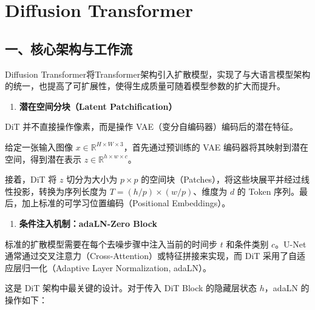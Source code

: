 \setcounter{section}{3}

\hypertarget{diffusion-transformer}{%
\section{Diffusion Transformer}\label{diffusion-transformer}}

\hypertarget{ux4e00ux6838ux5fc3ux67b6ux6784ux4e0eux5de5ux4f5cux6d41}{%
\subsection{一、核心架构与工作流}\label{ux4e00ux6838ux5fc3ux67b6ux6784ux4e0eux5de5ux4f5cux6d41}}

Diffusion Transformer将Transformer架构引入扩散模型，实现了与大语言模型架构的统一，也提高了可扩展性，使得生成质量可随着模型参数的扩大而提升。

\begin{enumerate}
\def\labelenumi{\arabic{enumi}.}
\tightlist
\item
  \textbf{潜在空间分块（Latent Patchification）}
\end{enumerate}

DiT 并不直接操作像素，而是操作 VAE（变分自编码器）编码后的潜在特征。

给定一张输入图像 \(x\in\mathbb{R}^{H\times W\times 3}\)，首先通过预训练的 VAE 编码器将其映射到潜在空间，得到潜在表示 \(z\in\mathbb{R}^{h\times w\times c}\)。

接着，DiT 将 \(z\) 切分为大小为 \(p\times p\) 的空间块（Patches），将这些块展平并经过线性投影，转换为序列长度为 \(T=(h/p)\times(w/p)\)、维度为 \(d\) 的 Token 序列。最后，加上标准的可学习位置编码（Positional Embeddings）。

\begin{enumerate}
\def\labelenumi{\arabic{enumi}.}
\setcounter{enumi}{1}
\tightlist
\item
  \textbf{条件注入机制：adaLN-Zero Block}
\end{enumerate}

标准的扩散模型需要在每个去噪步骤中注入当前的时间步 \(t\) 和条件类别 \(c\)。U-Net 通常通过交叉注意力（Cross-Attention）或特征拼接来实现，而 DiT 采用了自适应层归一化（Adaptive Layer Normalization, adaLN）。

这是 DiT 架构中最关键的设计。对于传入 DiT Block 的隐藏层状态 \(h\)，adaLN 的操作如下：

